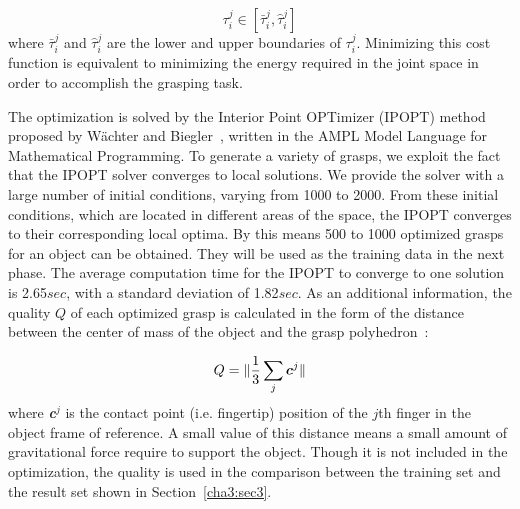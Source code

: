 \begin{equation}
 {\tau}^j_i \in [\bar{\tau}^j_i, \hat{\tau}^j_i]
 \label{quality}
\end{equation}
where $\bar{\tau}^j_i$ and $\hat{\tau}^j_i$ are the lower and upper boundaries of $\tau^j_i$.
Minimizing this cost function is equivalent to minimizing the energy required in the joint space in order to accomplish the grasping task.

The optimization is solved by the Interior Point OPTimizer (IPOPT) method proposed by W\"{a}chter and Biegler~\citep{wachter2006implementation}, written in the AMPL Model Language for Mathematical Programming. To generate a variety of grasps, we exploit the fact that the IPOPT solver converges to local solutions. We provide the solver with a large number of initial conditions, varying from 1000 to 2000. From these initial conditions, which are located in different areas of the space, the IPOPT converges to their corresponding local optima. By this means 500 to 1000 optimized grasps for an object can be obtained. They will be used as the training data in the next phase. The average computation time for the IPOPT to converge to one solution is 2.65$sec$, with a standard deviation of 1.82$sec$. As an additional information, the quality $Q$ of each optimized grasp is calculated in the form of the distance between the center of mass of the object and the grasp polyhedron~\citep{ponce1997computing}:

\begin{equation}
Q =\Arrowvert \frac{1}{3}\sum_{j} {\boldsymbol{c}^j}\Arrowvert
\vspace{-0.1in}
\end{equation}
where \textbf{\emph{c}}$^j$ is the contact point (i.e. fingertip) position of the $j$th finger in the object frame of reference. A small value of this distance means a small amount of gravitational force require to support the object.
Though it is not included in the optimization, the quality is used in the comparison between the training set and the result set shown in Section~\ref{cha3:sec3}.


